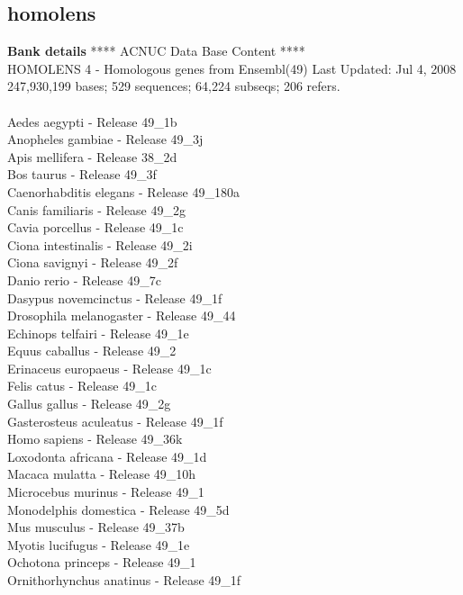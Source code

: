 \documentclass{article}
\begin{document}
\begin{Schunk}
\section{ homolens }
\textbf{Bank details}
             ****     ACNUC Data Base Content      ****\\
   HOMOLENS 4 - Homologous genes from Ensembl(49)	 Last Updated: Jul  4, 2008\\
247,930,199 bases; 529 sequences; 64,224 subseqs; 206 refers.\\
\\
 Aedes aegypti - Release 49\_1b \\
 Anopheles gambiae - Release 49\_3j \\
 Apis mellifera - Release 38\_2d \\
 Bos taurus - Release 49\_3f \\
 Caenorhabditis elegans - Release 49\_180a \\
 Canis familiaris - Release 49\_2g \\
 Cavia porcellus - Release 49\_1c \\
 Ciona intestinalis - Release 49\_2i \\
 Ciona savignyi - Release 49\_2f \\
 Danio rerio - Release 49\_7c \\
 Dasypus novemcinctus - Release 49\_1f \\
 Drosophila melanogaster - Release 49\_44 \\
 Echinops telfairi - Release 49\_1e \\
 Equus caballus - Release 49\_2 \\
 Erinaceus europaeus - Release 49\_1c \\
 Felis catus - Release 49\_1c \\
 Gallus gallus - Release 49\_2g \\
 Gasterosteus aculeatus - Release 49\_1f \\
 Homo sapiens - Release 49\_36k \\
 Loxodonta africana - Release 49\_1d \\
 Macaca mulatta - Release 49\_10h \\
 Microcebus murinus - Release 49\_1 \\
 Monodelphis domestica - Release 49\_5d \\
 Mus musculus - Release 49\_37b \\
 Myotis lucifugus - Release 49\_1e \\
 Ochotona princeps - Release 49\_1 \\
 Ornithorhynchus anatinus - Release 49\_1f \\

\end{Schunk}
\end{document}
